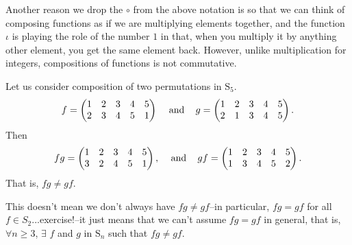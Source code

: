 \documentclass[11pt,dvipsnames]{book}
\numberwithin{figure}{section} %
\numberwithin{table}{section} %
\begin{document}
Another reason we drop the $\circ$ from the above notation is so that we can think of composing functions as if we are multiplying elements together, and the function $\iota$ is playing the role of the number $1$ in that, when you multiply it by anything other element, you get the same element back.  However, unlike multiplication for integers, compositions of functions is not commutative. 



 \begin{example}
  Let us consider composition of two permutations in $\mathrm{S}_5$.
  \[
  f= \left(\begin{matrix} %
1 & 2 & 3 & 4 & 5 \cr%
2 & 3 & 4 & 5 & 1\cr%
\end{matrix}\right)\;\;\;\mbox{ and } \;\;\; g=\left(\begin{matrix} %
1 & 2 & 3 & 4 & 5 \cr%
2 & 1 & 3 & 4 & 5\cr%
\end{matrix}\right).
\]
Then
\[
fg= \left(\begin{matrix} %
1 & 2 & 3 & 4 & 5 \cr%
3 & 2 & 4 & 5 & 1\cr%
\end{matrix}\right), \;\;\; \mbox{ and }\;\;\; gf = \left(\begin{matrix} %
1 & 2 & 3 & 4 & 5 \cr%
1 & 3 & 4 & 5 & 2\cr%
\end{matrix}\right).
\]
That is, $fg\neq gf$.
\end{example}

This doesn't mean we don't always have $fg\neq gf$--in particular, $fg=gf$ for all $f\in S_{2}$...exercise!--it just means that we can't assume $fg=gf$ in general, that is, $\forall n\geqslant 3$,  $\exists$ $f$ and $g$ in $\mathrm{S}_n$  such that  $fg\ne gf$. 
\end{document}
